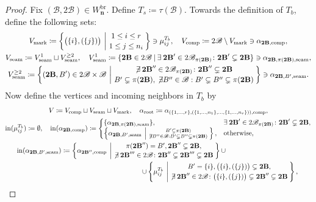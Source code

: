 \documentclass[11pt]{amsart}
\theoremstyle{definition}
\theoremstyle{remark}
\theoremstyle{plain}
\newcommand\bn{\mathbf{n}}
\newcommand{\btB}{{\mathbf{2B}}}
\newcommand{\sB}{\mathscr{B}}
\newcommand{\stB}{2\mathscr{B}}
\newcommand{\on}{\operatorname}
\newcommand{\comp}{C^2}
\renewcommand{\comp}{{\on{comp}}}
\newcommand{\seam}{{\on{seam}}}
\newcommand{\mk}{{\on{mark}}}
\newcommand{\incom}{\on{in}}
\renewcommand{\root}{{\on{root}}}
\newcommand{\br}{{\on{br}}}
\begin{document}
\begin{proof}
\noindent Fix $(\sB,\stB) \in W_\bn^\br$.
Define $T_s \coloneqq \tau(\sB)$.
Towards the definition of $T_b$, define the following sets:
\begin{gather}
V_\mk \coloneqq \left\{\bigl(\{i\},(\{j\})\bigr) \:\left|\: {{1 \leq i \leq r} \atop {1 \leq j \leq n_i}}\right.\right\} \ni \mu_{ij}^{T_b},
\quad
V_\comp \coloneqq \stB \setminus V_\mk \ni \alpha_{\btB,\comp},
\\
V_\seam \coloneqq V_\seam^1\sqcup V_\seam^{\geq2},
\quad
V_\seam^1 \coloneqq \{\btB \in \stB \:|\: \exists\: \btB' \in \stB_{\pi(\btB)}\colon \btB' \subsetneq \btB\} \ni \alpha_{\btB,\pi(\btB),\seam}, \nonumber
\\
V_\seam^{\geq2} \coloneqq \left\{(\btB,B') \in \stB \times \sB \:\left|\: {{\not\!\exists\: \btB'' \in \stB_{\pi(\btB)}\colon \btB'' \subsetneq \btB}\atop{B' \subsetneq \pi(\btB), \: \not\!\exists B'' \in \sB: B' \subsetneq B'' \subsetneq \pi(\btB)}}\right.\right\} \ni \alpha_{\btB,B',\seam} \nonumber.
\end{gather}
Now define the vertices and incoming neighbors in $T_b$ by
\begin{gather}
\label{eq:Tb_in}
V \coloneqq V_\comp \sqcup V_\seam \sqcup V_\mk, \quad \alpha_\root \coloneqq \alpha_{(\{1,\ldots,r\},(\{1,\ldots,n_1\},\ldots,\{1,\ldots,n_r\})),\comp},
\\
\incom(\mu_{ij}^{T_b}) \coloneqq \emptyset,
\quad
\incom(\alpha_{\btB,\comp}) \coloneqq \begin{cases}
\{\alpha_{\btB,\pi(\btB),\seam}\}, & \exists\: \btB' \in \stB_{\pi(\btB)} \colon \btB' \subsetneq \btB, \\
\left\{\alpha_{\btB,B',\seam} \:\left|\: {{B' \subsetneq \pi(\btB)}\atop{\not\exists B'' \in \sB: B' \subsetneq B'' \subsetneq \pi(\btB)}}\right.\right\}, & \text{otherwise},
\end{cases}
\nonumber
\\
\incom(\alpha_{\btB,B',\seam}) \coloneqq \left\{\alpha_{\btB'',\comp} \:\left|\: {{\pi(\btB'') = B', \btB'' \subsetneq \btB,} \atop {\not\!\exists\: \btB''' \in \stB \colon \btB'' \subsetneq \btB''' \subsetneq \btB}} \right.\right\}
\cup \hspace{1.5in}
\nonumber
\\
\hspace{2.5in} \cup
\left\{\mu_{ij}^{T_b} \:\left|\: {{B'=\{i\}, \bigl(\{i\},(\{j\})\bigr) \subsetneq \btB,} \atop {\not\!\exists\: \btB'' \in \stB \colon \bigl(\{i\},(\{j\})\bigr) \subsetneq \btB'' \subsetneq \btB}} \right.\right\},
\nonumber
\end{gather}

\end{proof}
\end{document}
